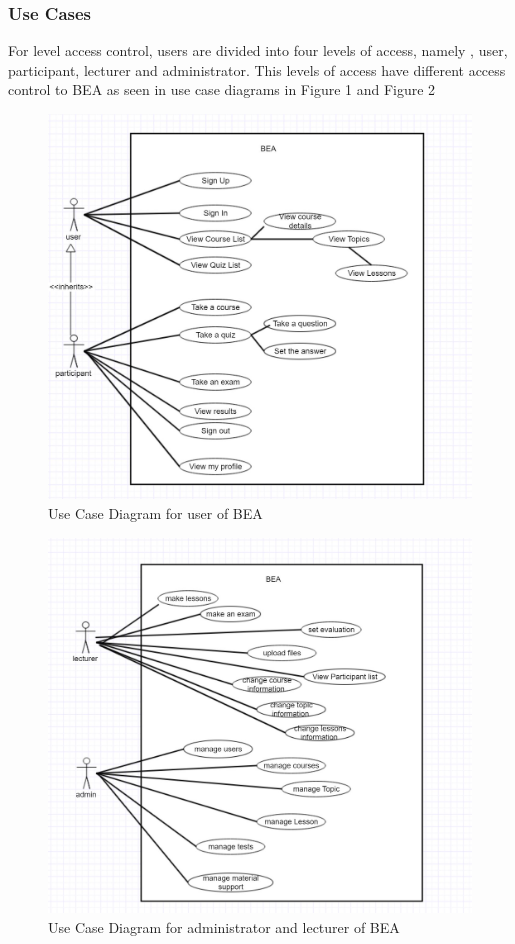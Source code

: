 \documentclass{scrartcl}
\begin{document}
  	\subsubsection{Use Cases }
  	For level access control, users are divided into four levels of access, namely , user, participant, lecturer and administrator. This levels of access have different access control to BEA  as seen in use case diagrams in Figure 1  and Figure 2
  	\begin{figure}[H]
\centering
\includegraphics[width=150mm]{ucd_user.JPG}
\caption{Use Case Diagram for user of BEA}
\label{ucd_user}
\end{figure}

\begin{figure}[H]
\centering
\includegraphics[width=150mm]{ucd_admin_lecturer.JPG}
\caption{Use Case Diagram for administrator and lecturer of BEA}
\label{ucd_user}
\end{figure}
\end{document}
